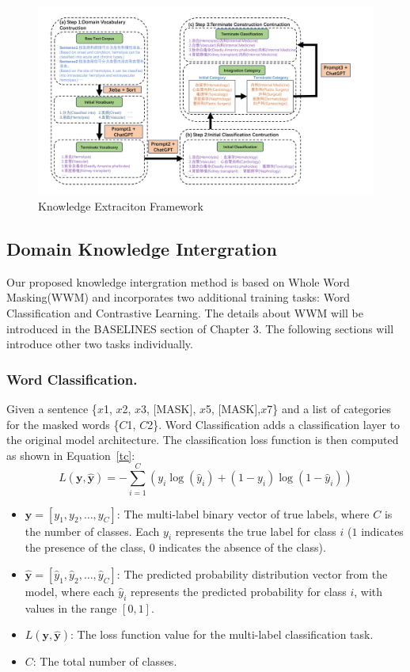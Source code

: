 \begin{figure}[ht]
	\centering
	\includegraphics[width=1.0\textwidth]{ChatGPT} 
	\caption{Knowledge Extraciton Framework}
	\label{ke}
\end{figure}
\subsection{Domain Knowledge Intergration}
Our proposed knowledge intergration method is based on Whole Word Masking(WWM)\cite{macbert} and incorporates two additional training tasks: Word Classification and Contrastive Learning. The details about WWM will be introduced in the BASELINES section of Chapter 3. The following sections will introduce other two tasks individually.
\subsubsection{Word Classification.}
Given a sentence \{$x${\tiny 1}, $x${\tiny 2}, $x${\tiny 3}, [MASK], $x${\tiny 5}, [MASK],$x${\tiny 7}\} and a list of categories for the masked words \{$C${\tiny 1}, $C${\tiny 2}\}. Word Classification adds a classification layer to the original model architecture. The classification loss function is then computed as shown in Equation~\ref{tc}:
\begin{equation}
	\label{tc}
	L(\mathbf{y}, \mathbf{\hat{y}}) = - \sum_{i=1}^C \left( y_i \log(\hat{y}_i) + (1 - y_i) \log(1 - \hat{y}_i) \right)
\end{equation}
\begin{itemize}
	\item $\mathbf{y} = [y_1, y_2, \ldots, y_C]$: The multi-label binary vector of true labels, where $C$ is the number of classes. Each $y_i$ represents the true label for class $i$ ($1$ indicates the presence of the class, $0$ indicates the absence of the class).
	\item $\mathbf{\hat{y}} = [\hat{y}_1, \hat{y}_2, \ldots, \hat{y}_C]$: The predicted probability distribution vector from the model, where each $\hat{y}_i$ represents the predicted probability for class $i$, with values in the range $[0, 1]$.
	\item $L(\mathbf{y}, \mathbf{\hat{y}})$: The loss function value for the multi-label classification task.
	\item $C$: The total number of classes.
\end{itemize}
